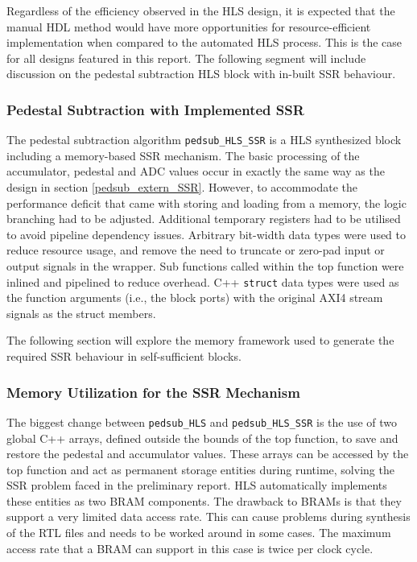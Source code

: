 \documentclass[10pt]{article}
\begin{document}
Regardless of the efficiency observed in the HLS design, it is expected that the manual HDL method would have more opportunities for resource-efficient implementation when compared to the automated HLS process. This is the case for all designs featured in this report. The following segment will include discussion on the pedestal subtraction HLS block with in-built SSR behaviour.


\subsubsection{Pedestal Subtraction with Implemented SSR} \label{pedsub_w_SSR}

The pedestal subtraction algorithm \texttt{pedsub\_HLS\_SSR} is a HLS synthesized block including a memory-based SSR mechanism. The basic processing of the accumulator, pedestal and ADC values occur in exactly the same way as the design in section \ref{pedsub_extern_SSR}. However, to accommodate the performance deficit that came with storing and loading from a memory, the logic branching had to be adjusted. Additional temporary registers had to be utilised to avoid pipeline dependency issues. Arbitrary bit-width data types were used to reduce resource usage, and remove the need to truncate or zero-pad input or output signals in the wrapper. Sub functions called within the top function were inlined and pipelined to reduce overhead. C++ \texttt{struct} data types were used as the function arguments (i.e., the block ports) with the original AXI4 stream signals as the struct members.

The following section will explore the memory framework used to generate the required SSR behaviour in self-sufficient blocks.

\subsubsection*{Memory Utilization for the SSR Mechanism} \label{BRAM_SSR}

The biggest change between \texttt{pedsub\_HLS} and \texttt{pedsub\_HLS\_SSR} is the use of two global C++ arrays, defined outside the bounds of the top function, to save and restore the pedestal and accumulator values. These arrays can be accessed by the top function and act as permanent storage entities during runtime, solving the SSR problem faced in the preliminary report. HLS automatically implements these entities as two BRAM components. The drawback to BRAMs is that they support a very limited data access rate. This can cause problems during synthesis of the RTL files and needs to be worked around in some cases. The maximum access rate that a BRAM can support in this case is twice per clock cycle.
\end{document}
